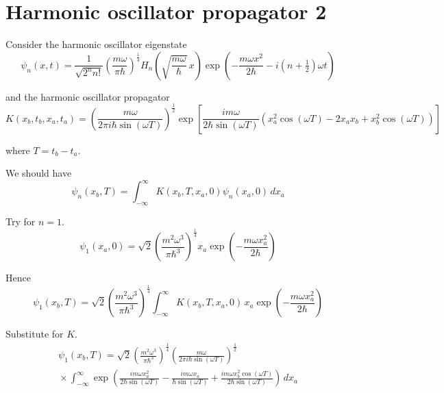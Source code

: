 


\section*{Harmonic oscillator propagator 2}

Consider the harmonic oscillator eigenstate
\begin{equation*}
\psi_n(x,t)=\frac{1}{\sqrt{2^nn!}}\left(\frac{m\omega}{\pi\hbar}\right)^\frac{1}{4}
H_n\left(\sqrt{\frac{m\omega}{\hbar}}\,x\right)
\exp\left(-\frac{m\omega x^2}{2\hbar}-i\left(n+\tfrac{1}{2}\right)\omega t\right)
\end{equation*}

and the harmonic oscillator propagator
\begin{equation*}
K(x_b,t_b,x_a,t_a)
=\left(\frac{m\omega}{2\pi i\hbar\sin(\omega T)}\right)^\frac{1}{2}
\exp\left[
\frac{im\omega}{2\hbar\sin(\omega T)}
\left(x_a^2\cos(\omega T)-2x_ax_b+x_b^2\cos(\omega T)\right)
\right]
\end{equation*}

where $T=t_b-t_a$.

\bigskip
We should have
\begin{equation*}
\psi_n(x_b,T)=\int_{-\infty}^\infty K(x_b,T,x_a,0)\psi_n(x_a,0)\,dx_a
\end{equation*}

Try for $n=1$.
\begin{equation*}
\psi_1(x_a,0)=\sqrt2\left(\frac{m^2\omega^3}{\pi\hbar^3}\right)^\frac{1}{4}
x_a\exp\left(-\frac{m\omega x_a^2}{2\hbar}\right)
\end{equation*}

Hence
\begin{equation*}
\psi_1(x_b,T)
=\sqrt2\left(\frac{m^2\omega^3}{\pi\hbar^3}\right)^\frac{1}{4}
\int_{-\infty}^\infty
K(x_b,T,x_a,0)\,
x_a\exp\left(-\frac{m\omega x_a^2}{2\hbar}\right)
\end{equation*}

Substitute for $K$.
\begin{multline*}
\psi_1(x_b,T)
=\sqrt2\left(\frac{m^2\omega^3}{\pi\hbar^3}\right)^\frac{1}{4}
\left(\frac{m\omega}{2\pi i\hbar\sin(\omega T)}\right)^\frac{1}{2}
\\
{}\times
\int_{-\infty}^\infty\exp\left(
\frac{im\omega x_a^2}{2\hbar\sin(\omega T)}
-\frac{im\omega x_a}{\hbar\sin(\omega T)}
+\frac{im\omega x_b^2\cos(\omega T)}{2\hbar\sin(\omega T)}
\right)\,dx_a
\end{multline*}

